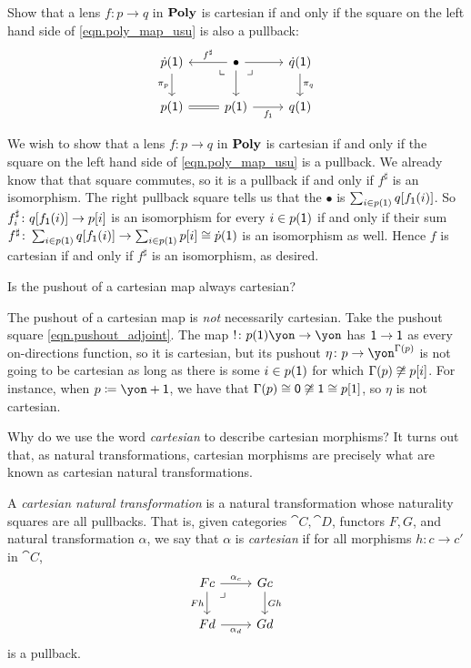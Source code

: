 \documentclass[Book-Poly]{subfiles}
\begin{document}
\begin{exercise} \label{exc.cart_pullbacks}
Show that a lens $f\colon p\to q$ in $\mathbf{Poly}$ is cartesian if and only if the square on the left hand side of \eqref{eqn.poly_map_usu} is also a pullback:
\[
\begin{tikzcd}
	\dot{p}(\1)\ar[d, "\pi_p"']&
	\bullet\ar[l, "f^\sharp"']\ar[r]\ar[d]&
	\dot{q}(\1)\ar[d, "\pi_q"]\\
	p(\1)\ar[r, equal]\ar[ur, phantom, very near end, "\llcorner"]&
	p(\1)\ar[r, "f_\1"']&
	q(\1)\ar[ul, phantom, very near end, "\lrcorner"]
\end{tikzcd}
\]
\begin{solution}
We wish to show that a lens $f\colon p\to q$ in $\mathbf{Poly}$ is cartesian if and only if the square on the left hand side of \eqref{eqn.poly_map_usu} is a pullback.
We already know that that square commutes, so it is a pullback if and only if $f^\sharp$ is an isomorphism.
The right pullback square tells us that the $\bullet$ is $\sum_{i\in p(\textsf{1})}q[f_{\textsf{1}}(i)]$.
So $f^\sharp_i\colon q[f_{\textsf{1}}(i)]\to p[i]$ is an isomorphism for every $i\in p(\textsf{1})$ if and only if their sum $f^\sharp\colon\sum_{i\in p(\textsf{1})}q[f_{\textsf{1}}(i)]\to\sum_{i\in p(\textsf{1})}p[i]\cong\dot{p}(\textsf{1})$ is an isomorphism as well.
Hence $f$ is cartesian if and only if $f^\sharp$ is an isomorphism, as desired.
\end{solution}
\end{exercise}

\begin{exercise}
Is the pushout of a cartesian map always cartesian?
\begin{solution}
The pushout of a cartesian map is \emph{not} necessarily cartesian.
Take the pushout square \eqref{eqn.pushout_adjoint}.
The map $!\colon p(\1)\yon\to\yon$ has $\textsf{1}\to\textsf{1}$ as every on-directions function, so it is cartesian, but its pushout $\eta\colon p\to\yon^{\Gamma(p)}$ is not going to be cartesian as long as there is some $i\in p(\textsf{1})$ for which $\Gamma(p)\not\cong p[i]$.
For instance, when $p\coloneqq\yon+\1$, we have that $\Gamma(p)\cong\textsf{0}\not\cong\textsf{1}\cong p[1]$, so $\eta$ is not cartesian.
\end{solution}
\end{exercise}

Why do we use the word \emph{cartesian} to describe cartesian morphisms? It turns out that, as natural transformations, cartesian morphisms are precisely what are known as cartesian natural transformations.

\begin{definition} \label{def.cart_nat_trans}
A \emph{cartesian natural transformation} is a natural transformation whose naturality squares are all pullbacks.
That is, given categories $\cat{C},\cat{D}$, functors $F,G$, and natural transformation $\alpha$, we say that $\alpha$ is \emph{cartesian} if for all morphisms $h\colon c\to c'$ in $\cat{C}$,
\[
\begin{tikzcd}
    Fc \ar[d, "Fh"'] \ar[r, "\alpha_c"] & Gc \ar[d, "Gh"] \\
    Fd \ar[r, "\alpha_d"'] & Gd \ar[ul, phantom, very near end, "\lrcorner"]
\end{tikzcd}
\]
is a pullback.
\end{definition}
\end{document}
